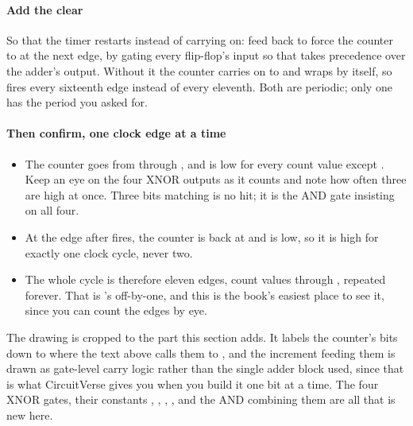 \paragraph{Add the clear}
So that the timer restarts instead of carrying on: feed  back to force the counter to
 at the next edge, by gating every flip-flop's  input so that 
takes precedence over the adder's output. Without it the counter carries on to  and wraps
by itself, so  fires every sixteenth edge instead of every eleventh. Both are
periodic; only one has the period you asked for.

\paragraph{Then confirm, one clock edge at a time}
\begin{itemize}
  \item The counter goes from  through , and  is low for every
    count value except . Keep an eye on the four XNOR outputs as it counts and note how
    often three are high at once. Three bits matching is no hit; it is the AND gate insisting on all
    four.
  \item At the edge after  fires, the counter is back at  and
     is low, so it is high for exactly one clock cycle, never two.
  \item The whole cycle is therefore eleven edges, count values  through , repeated
    forever. That is 's  off-by-one, and this is the
    book's easiest place to see it, since you can count the edges by eye.
\end{itemize}


The drawing is cropped to the part this section adds. It labels the counter's bits
 down to  where the text above calls them  to ,
and the increment feeding them is drawn as gate-level carry logic rather than the single adder block
 used, since that is what CircuitVerse gives you when you build it one bit at
a time. The four XNOR gates, their constants , , , , and the AND
combining them are all that is new here.

